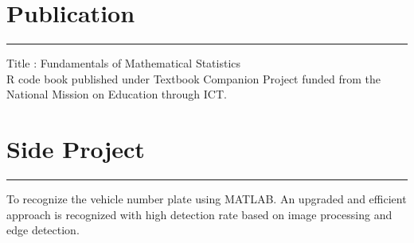 \documentclass[]{meetresume-class}
\begin{document}
\begin{minipage}[t]{0.66\textwidth}
		\section{Publication} 
		\noindent\rule{12.5cm}{0.4pt}
		 
		\noindent
		\hspace{5em}%
		\begin{minipage}{0.85\textwidth\vspace{2pt}}
			Title : Fundamentals of Mathematical Statistics\\
			R code book published under Textbook Companion Project funded
			from the National Mission on Education through ICT.

		\end{minipage}
		\section{Side Project}
		\noindent\rule{12.5cm}{0.4pt}
		 
		\noindent
		\hspace{5em}%
		\begin{minipage}{0.85\textwidth\vspace{5pt}}
			To recognize the vehicle number plate using MATLAB. An upgraded and
			efficient approach is recognized with high detection rate based on image
			processing and edge detection.
		\end{minipage}
	\end{minipage} 
\end{document}
